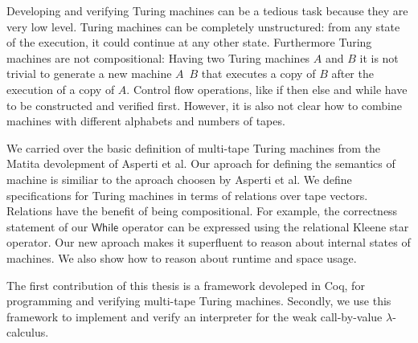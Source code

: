 Developing and verifying Turing machines can be a tedious task because they are very low level.  Turing machines can be completely unstructured:
from any state of the execution, it could continue at any other state.  Furthermore Turing machines are not compositional: Having two Turing
machines $A$ and $B$ it is not trivial to generate a new machine $A\;~B$ that executes a copy of $B$ after the execution of a copy of $A$.
Control flow operations, like if then else and while have to be constructed and verified first.  However, it is also not clear how to combine
machines with different alphabets and numbers of tapes.

We carried over the basic definition of multi-tape Turing machines from the Matita devolepment of Asperti et al.  Our aproach for defining the
semantics of machine is similiar to the aproach choosen by Asperti et al.  We define specifications for Turing machines in terms of relations over
tape vectors.  Relations have the benefit of being compositional.  For example, the correctness statement of our $\mathsf{While}$ operator can be
expressed using the relational Kleene star operator.  Our new aproach makes it superfluent to reason about internal states of machines.  We also
show how to reason about runtime and space usage.

The first contribution of this thesis is a framework devoleped in Coq, for programming and verifying multi-tape Turing machines.  Secondly, we use
this framework to implement and verify an interpreter for the weak call-by-value $\lambda$-calculus.



